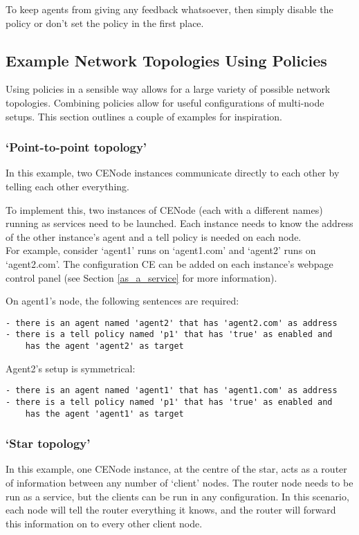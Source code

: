 \documentclass{scrartcl}
\begin{document}
To keep agents from giving any feedback whatsoever, then simply disable the policy or don't set the policy in the first place.

\subsection{Example Network Topologies Using Policies}
Using policies in a sensible way allows for a large variety of possible network topologies. Combining policies allow for useful configurations of multi-node setups. This section outlines a couple of examples for inspiration.

\subsubsection{`Point-to-point topology'}
In this example, two CENode instances communicate directly to each other by telling each other everything.

To implement this, two instances of CENode (each with a different names) running as services need to be launched. Each instance needs to know the address of the other instance's agent and a tell policy is needed on each node.\\

For example, consider `agent1' runs on `agent1.com' and `agent2' runs on `agent2.com'. The configuration CE can be added on each instance's webpage control panel (see Section \ref{as_a_service} for more information).

On agent1's node, the following sentences are required:\\
\begin{verbatim}
- there is an agent named 'agent2' that has 'agent2.com' as address
- there is a tell policy named 'p1' that has 'true' as enabled and 
    has the agent 'agent2' as target
\end{verbatim}

Agent2's setup is symmetrical:\\
\begin{verbatim}
- there is an agent named 'agent1' that has 'agent1.com' as address
- there is a tell policy named 'p1' that has 'true' as enabled and 
    has the agent 'agent1' as target
\end{verbatim}


\subsubsection{`Star topology'}
In this example, one CENode instance, at the centre of the star, acts as a router of information between any number of `client' nodes. The router node needs to be run as a service, but the clients can be run in any configuration. In this scenario, each node will tell the router everything it knows, and the router will forward this information on to every other client node.\\
\end{document}
